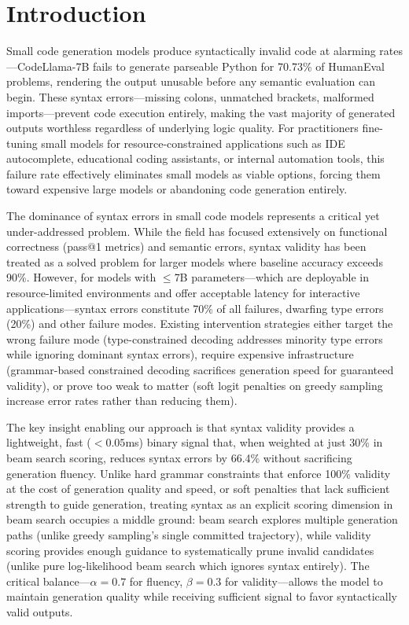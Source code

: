 \section{Introduction}

Small code generation models produce syntactically invalid code at alarming rates---CodeLlama-7B fails to generate parseable Python for 70.73\% of HumanEval problems, rendering the output unusable before any semantic evaluation can begin. These syntax errors---missing colons, unmatched brackets, malformed imports---prevent code execution entirely, making the vast majority of generated outputs worthless regardless of underlying logic quality. For practitioners fine-tuning small models for resource-constrained applications such as IDE autocomplete, educational coding assistants, or internal automation tools, this failure rate effectively eliminates small models as viable options, forcing them toward expensive large models or abandoning code generation entirely.

The dominance of syntax errors in small code models represents a critical yet under-addressed problem. While the field has focused extensively on functional correctness (pass@1 metrics) and semantic errors, syntax validity has been treated as a solved problem for larger models where baseline accuracy exceeds 90\%. However, for models with $\leq$7B parameters---which are deployable in resource-limited environments and offer acceptable latency for interactive applications---syntax errors constitute 70\% of all failures, dwarfing type errors (20\%) and other failure modes. Existing intervention strategies either target the wrong failure mode (type-constrained decoding addresses minority type errors while ignoring dominant syntax errors), require expensive infrastructure (grammar-based constrained decoding sacrifices generation speed for guaranteed validity), or prove too weak to matter (soft logit penalties on greedy sampling increase error rates rather than reducing them).

The key insight enabling our approach is that syntax validity provides a lightweight, fast ($<0.05$ms) binary signal that, when weighted at just 30\% in beam search scoring, reduces syntax errors by 66.4\% without sacrificing generation fluency. Unlike hard grammar constraints that enforce 100\% validity at the cost of generation quality and speed, or soft penalties that lack sufficient strength to guide generation, treating syntax as an explicit scoring dimension in beam search occupies a middle ground: beam search explores multiple generation paths (unlike greedy sampling's single committed trajectory), while validity scoring provides enough guidance to systematically prune invalid candidates (unlike pure log-likelihood beam search which ignores syntax entirely). The critical balance---$\alpha=0.7$ for fluency, $\beta=0.3$ for validity---allows the model to maintain generation quality while receiving sufficient signal to favor syntactically valid outputs.


